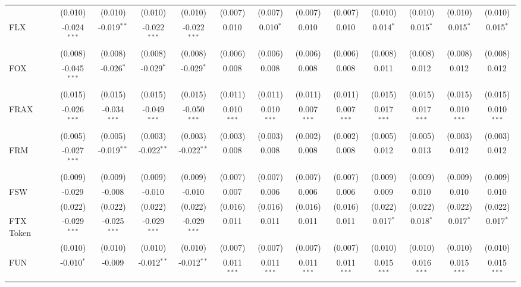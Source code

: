 \begin{table}[!htbp]
\begin{tabular}{@{\extracolsep{5pt}}lcccccccccccc}
  & (0.010) & (0.010) & (0.010) & (0.010) & (0.007) & (0.007) & (0.007) & (0.007) & (0.010) & (0.010) & (0.010) & (0.010) \\
 FLX & -0.024$^{***}$ & -0.019$^{**}$ & -0.022$^{***}$ & -0.022$^{***}$ & 0.010$^{}$ & 0.010$^{*}$ & 0.010$^{}$ & 0.010$^{}$ & 0.014$^{*}$ & 0.015$^{*}$ & 0.015$^{*}$ & 0.015$^{*}$ \\
  & (0.008) & (0.008) & (0.008) & (0.008) & (0.006) & (0.006) & (0.006) & (0.006) & (0.008) & (0.008) & (0.008) & (0.008) \\
 FOX & -0.045$^{***}$ & -0.026$^{*}$ & -0.029$^{*}$ & -0.029$^{*}$ & 0.008$^{}$ & 0.008$^{}$ & 0.008$^{}$ & 0.008$^{}$ & 0.011$^{}$ & 0.012$^{}$ & 0.012$^{}$ & 0.012$^{}$ \\
  & (0.015) & (0.015) & (0.015) & (0.015) & (0.011) & (0.011) & (0.011) & (0.011) & (0.015) & (0.015) & (0.015) & (0.015) \\
 FRAX & -0.026$^{***}$ & -0.034$^{***}$ & -0.049$^{***}$ & -0.050$^{***}$ & 0.010$^{***}$ & 0.010$^{***}$ & 0.007$^{***}$ & 0.007$^{***}$ & 0.017$^{***}$ & 0.017$^{***}$ & 0.010$^{***}$ & 0.010$^{***}$ \\
  & (0.005) & (0.005) & (0.003) & (0.003) & (0.003) & (0.003) & (0.002) & (0.002) & (0.005) & (0.005) & (0.003) & (0.003) \\
 FRM & -0.027$^{***}$ & -0.019$^{**}$ & -0.022$^{**}$ & -0.022$^{**}$ & 0.008$^{}$ & 0.008$^{}$ & 0.008$^{}$ & 0.008$^{}$ & 0.012$^{}$ & 0.013$^{}$ & 0.012$^{}$ & 0.012$^{}$ \\
  & (0.009) & (0.009) & (0.009) & (0.009) & (0.007) & (0.007) & (0.007) & (0.007) & (0.009) & (0.009) & (0.009) & (0.009) \\
 FSW & -0.029$^{}$ & -0.008$^{}$ & -0.010$^{}$ & -0.010$^{}$ & 0.007$^{}$ & 0.006$^{}$ & 0.006$^{}$ & 0.006$^{}$ & 0.009$^{}$ & 0.010$^{}$ & 0.010$^{}$ & 0.010$^{}$ \\
  & (0.022) & (0.022) & (0.022) & (0.022) & (0.016) & (0.016) & (0.016) & (0.016) & (0.022) & (0.022) & (0.022) & (0.022) \\
 FTX Token & -0.029$^{***}$ & -0.025$^{***}$ & -0.029$^{***}$ & -0.029$^{***}$ & 0.011$^{}$ & 0.011$^{}$ & 0.011$^{}$ & 0.011$^{}$ & 0.017$^{*}$ & 0.018$^{*}$ & 0.017$^{*}$ & 0.017$^{*}$ \\
  & (0.010) & (0.010) & (0.010) & (0.010) & (0.007) & (0.007) & (0.007) & (0.007) & (0.010) & (0.010) & (0.010) & (0.010) \\
 FUN & -0.010$^{*}$ & -0.009$^{}$ & -0.012$^{**}$ & -0.012$^{**}$ & 0.011$^{***}$ & 0.011$^{***}$ & 0.011$^{***}$ & 0.011$^{***}$ & 0.015$^{***}$ & 0.016$^{***}$ & 0.015$^{***}$ & 0.015$^{***}$ \\

\end{tabular}
\end{table}

